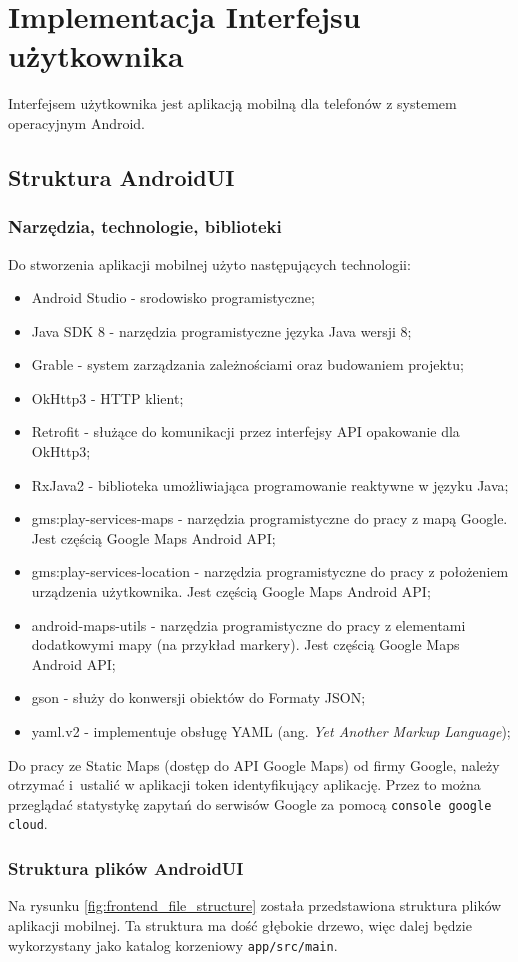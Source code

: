%
\section{Implementacja Interfejsu użytkownika}
Interfejsem użytkownika jest aplikacją mobilną dla telefonów z systemem operacyjnym Android.
\subsection{Struktura AndroidUI}
\subsubsection{Narzędzia, technologie, biblioteki}
Do stworzenia aplikacji mobilnej użyto następujących technologii:
\begin{itemize}
    \item Android Studio - srodowisko programistyczne;
    \item Java SDK 8 - narzędzia programistyczne języka Java wersji 8;
    \item Grable - system zarządzania zależnościami oraz budowaniem projektu;
    \item OkHttp3 - HTTP klient;
    \item Retrofit - służące do komunikacji przez interfejsy API opakowanie dla OkHttp3;
    \item RxJava2 - biblioteka umożliwiająca programowanie reaktywne w języku Java;
    \item gms:play-services-maps - narzędzia programistyczne do pracy z mapą Google. Jest częścią Google Maps Android API;
    \item gms:play-services-location - narzędzia programistyczne do pracy z położeniem urządzenia użytkownika. Jest częścią Google Maps Android API;
    \item android-maps-utils - narzędzia programistyczne do pracy z elementami dodatkowymi mapy (na przykład markery). Jest częścią Google Maps Android API;
    \item gson - służy do konwersji obiektów do Formaty JSON;
    \item yaml.v2 - implementuje obsługę YAML (ang. \textit{Yet Another Markup Language});
\end{itemize}

Do pracy ze Static Maps (dostęp do API Google Maps) od firmy Google, należy otrzymać i~ustalić w aplikacji token identyfikujący aplikację. Przez to można przeglądać statystykę zapytań do serwisów Google za pomocą \texttt{console google cloud}.
\subsubsection{Struktura plików AndroidUI}
Na rysunku \ref{fig:frontend_file_structure} została przedstawiona struktura plików aplikacji mobilnej. Ta struktura ma dość głębokie drzewo, więc dalej będzie wykorzystany jako katalog korzeniowy \texttt{app/src/main}.

